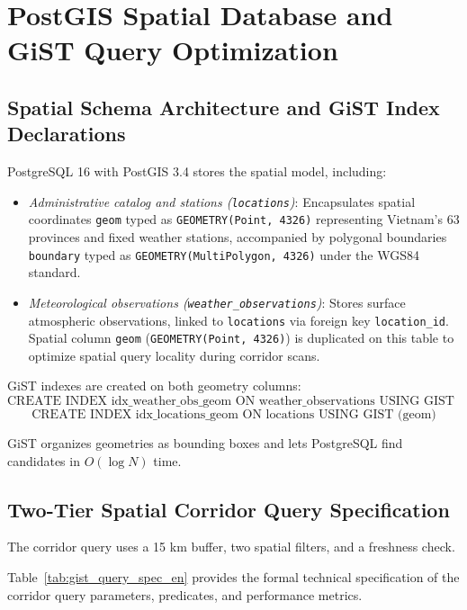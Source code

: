 \section{PostGIS Spatial Database and GiST Query Optimization}
\label{sec:postgis_gist_impl}

\subsection{Spatial Schema Architecture and GiST Index Declarations}
PostgreSQL 16 with PostGIS 3.4 stores the spatial model, including:
\begin{itemize}
    \item[-] \textit{Administrative catalog and stations (\texttt{locations})}: Encapsulates spatial coordinates \texttt{geom} typed as \texttt{GEOMETRY(Point, 4326)} representing Vietnam's 63 provinces and fixed weather stations, accompanied by polygonal boundaries \texttt{boundary} typed as \texttt{GEOMETRY(MultiPolygon, 4326)} under the WGS84 standard.
    \item[-] \textit{Meteorological observations (\texttt{weather\_observations})}: Stores surface atmospheric observations, linked to \texttt{locations} via foreign key \texttt{location\_id}. Spatial column \texttt{geom} (\texttt{GEOMETRY(Point, 4326)}) is duplicated on this table to optimize spatial query locality during corridor scans.
\end{itemize}

GiST indexes are created on both geometry columns:
\begin{equation}
\label{eq:gist_index_def_en}
\text{CREATE INDEX idx\_weather\_obs\_geom ON weather\_observations USING GIST (geom)}
\end{equation}
\begin{equation}
\label{eq:gist_loc_def_en}
\text{CREATE INDEX idx\_locations\_geom ON locations USING GIST (geom)}
\end{equation}

GiST organizes geometries as bounding boxes and lets PostgreSQL find candidates in $O(\log N)$ time.

\subsection{Two-Tier Spatial Corridor Query Specification}
The corridor query uses a 15 km buffer, two spatial filters, and a freshness check.

Table~\ref{tab:gist_query_spec_en} provides the formal technical specification of the corridor query parameters, predicates, and performance metrics.

